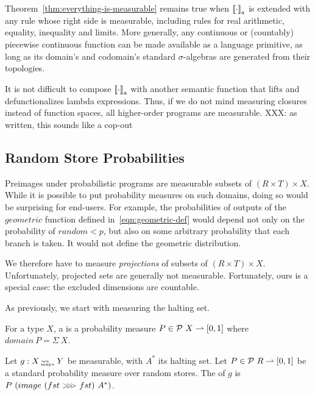 \documentclass[preprint]{sigplanconf}
\newcommand{\arrow}{\rightsquigarrow}
\newcommand{\pto}{\rightharpoonup}
\newcommand{\arrowcomp}{\ensuremath{{>}\mspace{-6mu}{>}\mspace{-6mu}{>}}}
\newcommand{\gen}{_\mathrm{a}}
\DeclareMathOperator{\pmapto}{\arrow_{\mspace{-22mu}_{\mathrm{map*}}}}
\begin{document}
Theorem~\ref{thm:everything-is-measurable} remains true when $\meaningof{\cdot}\gen$ is extended with any rule whose right side is measurable, including rules for real arithmetic, equality, inequality and limits.
More generally, any continuous or (countably) piecewise continuous function can be made available as a language primitive, as long as its domain's and codomain's standard $\sigma$-algebras are generated from their topologies.

It is not difficult to compose $\meaningof{\cdot}\gen$ with another semantic function that lifts and defunctionalizes lambda expressions.
Thus, if we do not mind measuring closures instead of function spaces, all higher-order programs are measurable.
XXX: as written, this sounds like a cop-out

\subsection{Random Store Probabilities}

Preimages under probabilistic programs are measurable subsets of $(R \times T) \times X$.
While it is possible to put probability measures on such domains, doing so would be surprising for end-users.
For example, the probabilities of outputs of the $geometric$ function defined in~\eqref{eqn:geometric-def} would depend not only on the probability of $random < p$, but also on some arbitrary probability that each branch is taken.
It would not define the geometric distribution.

We therefore have to measure \emph{projections} of subsets of $(R \times T) \times X$.
Unfortunately, projected sets are generally not measurable.
Fortunately, ours is a special case: the excluded dimensions are countable.

As previously, we start with measuring the halting set.

\begin{definition}
For a type $X$, a  is a probability measure $P \in \powerset~X \pto [0,1]$ where $domain~P = \Sigma~X$.
\end{definition}

\begin{definition}
Let $g : X \pmapto Y$ be measurable, with $A^*$ its halting set.
Let $P \in \powerset~R \pto [0,1]$ be a standard probability measure over random stores.
The  of $g$ is $P~(image~(fst~\arrowcomp~fst)~A^*)$.
\end{definition}
\end{document}
